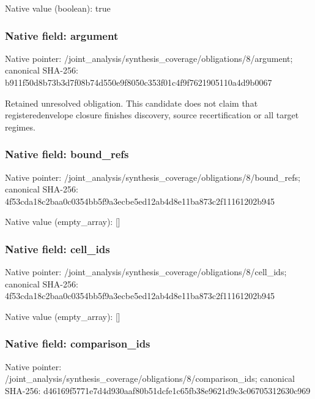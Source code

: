 \documentclass[10pt,a4paper]{article}
\begin{document}
Native value (boolean): true



\subsubsection{Native field: argument}


Native pointer: /joint\_analysis/synthesi\allowbreak{}s\_coverage/obligations/8\allowbreak{}/argument; canonical SHA-256: b911f50d8b73b3d7f08b74d5\allowbreak{}50e9f8050c353f01c4f9f762\allowbreak{}1905110a4d9b0067


Retained unresolved obligation. This candidate does not claim that registeredenvelope closure finishes discovery, source recertification or all target regimes.


\subsubsection{Native field: bound\_refs}


Native pointer: /joint\_analysis/synthesi\allowbreak{}s\_coverage/obligations/8\allowbreak{}/bound\_refs; canonical SHA-256: 4f53cda18c2baa0c0354bb5f\allowbreak{}9a3ecbe5ed12ab4d8e11ba87\allowbreak{}3c2f11161202b945



Native value (empty\_array): []



\subsubsection{Native field: cell\_ids}


Native pointer: /joint\_analysis/synthesi\allowbreak{}s\_coverage/obligations/8\allowbreak{}/cell\_ids; canonical SHA-256: 4f53cda18c2baa0c0354bb5f\allowbreak{}9a3ecbe5ed12ab4d8e11ba87\allowbreak{}3c2f11161202b945



Native value (empty\_array): []



\subsubsection{Native field: comparison\_ids}


Native pointer: /joint\_analysis/synthesi\allowbreak{}s\_coverage/obligations/8\allowbreak{}/comparison\_ids; canonical SHA-256: d46169f5771e7d4d930aaf80\allowbreak{}b51dcfe1c65fb38e9621d9c3\allowbreak{}c06705312630c969
\end{document}
